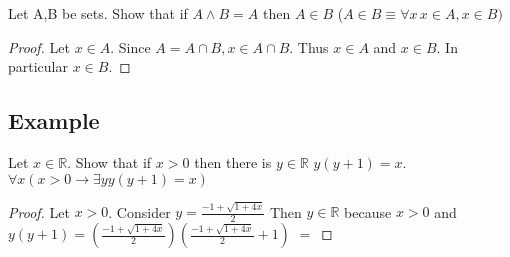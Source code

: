 \documentclass[12pt, letterpaper]{article}
\begin{document}
    Let A,B be sets. Show that if $A \land B = A$ then $A \in B$ ($A \in B \equiv \forall x
    \, x \in A, x \in B)$

    \begin{proof}
        Let $x \in A$. Since $A = A \cap B, x\in A \cap B$. Thus $x \in A$ and $x \in B$.
        In particular $x \in B$.
    \end{proof}

    \subsection{Example}

    Let $x \in \mathbb{R}$. Show that if $x>0$ then there is $y\in \mathbb{R}$ $y(y+1) = x$.
     $\forall x (x > 0 \rightarrow \exists y y (y+1) = x)$

    \begin{proof}
        Let $x>0$. Consider $ y = \frac{-1+\sqrt{1+4x}}{2}$ Then $ y \in \mathbb{R}$ because 
        $x > 0$ and $y(y+1) = (\frac{-1+\sqrt{1+4x}}{2})(\frac{-1+\sqrt{1+4x}}{2} + 1)$
        $=$
    \end{proof}
\end{document}
